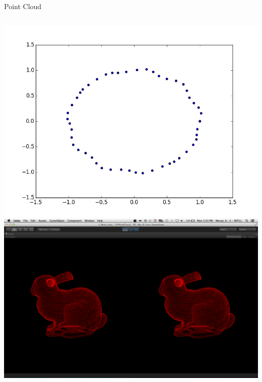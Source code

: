 \documentclass{beamer}
\begin{document}
\begin{frame}{Point Cloud}
  \begin{columns}
    \includegraphics[width=\textwidth]{Images/point_cloud.png}
    \includegraphics[width=\textwidth]{Images/bunny_dense.png}
  \end{columns}
\end{frame}
\end{document}
